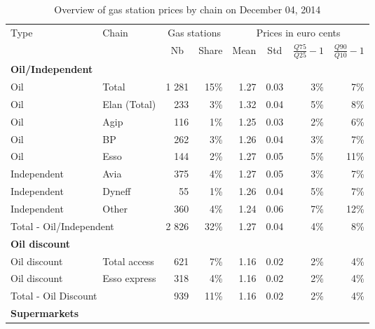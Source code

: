\documentclass[english]{article}
\begin{document}
\begin{table}
\caption{Overview of gas station prices by chain on December 04, 2014}
\label{tab:station_chains}
\begin{threeparttable}
\begin{tabular}{llrr|rrrr}
    \toprule
    \toprule
    Type  & \multicolumn{1}{l}{Chain} & \multicolumn{2}{c|}{Gas stations} & \multicolumn{4}{c}{Prices in euro cents} \\
          &       & \multicolumn{1}{c}{Nb } & \multicolumn{1}{c|}{Share} & \multicolumn{1}{c}{Mean} & \multicolumn{1}{c}{Std} & \multicolumn{1}{c}{$\frac{Q75}{Q25}-1$} & \multicolumn{1}{c}{$\frac{Q90}{Q10}-1$} \\
    \midrule
    \textbf{Oil/Independent} &       &       &       &       &       &       &  \\
    Oil   & Total & 1 281 & 15\%  & 1.27  & 0.03  & 3\%   & 7\% \\
    Oil   & Elan (Total) & 233   & 3\%   & 1.32  & 0.04  & 5\%   & 8\% \\
    Oil   & Agip  & 116   & 1\%   & 1.25  & 0.03  & 2\%   & 6\% \\
    Oil   & BP    & 262   & 3\%   & 1.26  & 0.04  & 3\%   & 7\% \\
    Oil   & Esso  & 144   & 2\%   & 1.27  & 0.05  & 5\%   & 11\% \\
    Independent & Avia  & 375   & 4\%   & 1.27  & 0.05  & 3\%   & 7\% \\
    Independent & Dyneff & 55    & 1\%   & 1.26  & 0.04  & 5\%   & 7\% \\
    Independent & Other & 360   & 4\%   & 1.24  & 0.06  & 7\%   & 12\% \\
    \midrule
    \multicolumn{2}{l}{Total - Oil/Independent} & 2 826 & 32\%  & 1.27  & 0.04  & 4\%   & 8\% \\
    \midrule
    \textbf{Oil discount} &       &       &      &       &       &       &  \\
    Oil discount & Total access & 621   & 7\%   & 1.16  & 0.02  & 2\%   & 4\% \\
    Oil discount & Esso express & 318   & 4\%   & 1.16  & 0.02  & 2\%   & 4\% \\
    \midrule
    \multicolumn{2}{l}{Total - Oil Discount} & 939   & 11\%  & 1.16  & 0.02  & 2\%   & 4\% \\
    \midrule
    \textbf{Supermarkets} &       &       &      &       &       &       &  \\

\end{tabular}
\end{threeparttable}
\end{table}
\end{document}
